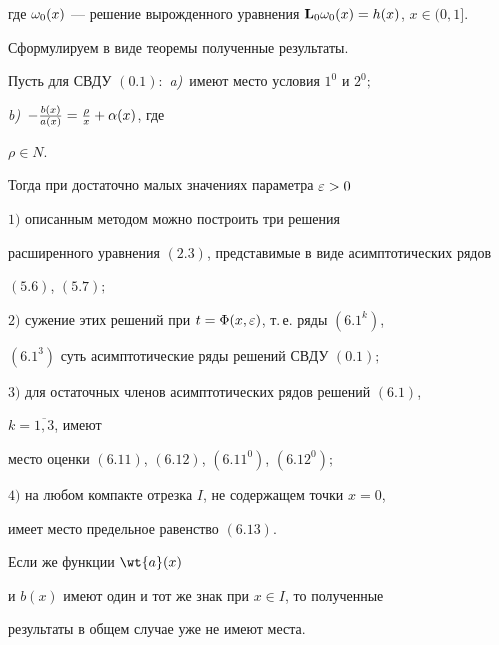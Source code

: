 где $\o_0 (x)$ --- решение вырожденного уравнения $\bold{L}_0


\o_0 (x) = h (x)$, $ x\in (0,1]$.





Сформулируем в виде теоремы полученные результаты.





\begin{thmnonum}


Пусть для СВДУ $(0.1){:}$ {\em a)}~имеют место условия $1^0$ и $2^0;$


{\em b)}~$-\frac{b(x)}{a(x)}=\frac{\rho}{x} + \aa(x)$, где


$\rho \in N $.


Тогда при достаточно малых значениях параметра $\e > 0$





$1)$ описанным методом можно построить три решения


расширенного уравнения $(2.3)$, представимые в виде асимптотических рядов


$(5.6)$, $(5.7);$





$2)$ сужение этих решений при $t=\Phi(x,\e)$, т.\,е. ряды $(6.1^k)$,


$(6.1^3)$ суть асимптотические ряды решений СВДУ $(0.1);$





$3)$ для остаточных членов асимптотических рядов решений $(6.1)$,


$k = \overline{1,3}$, имеют


место оценки $(6.11)$, $(6.12)$, $(6.11^0)$, $(6.12^0);$





$4)$ на любом компакте отрезка $I$, не содержащем точки $x=0$,


имеет место предельное равенство $(6.13)$.


\end{thmnonum}





\begin{note}


Если же функции $\wt{a}(x)$


и $b(x)$ имеют один и тот же знак при $x \in I$, то полученные


результаты в общем случае уже не имеют места.


\end{note}








